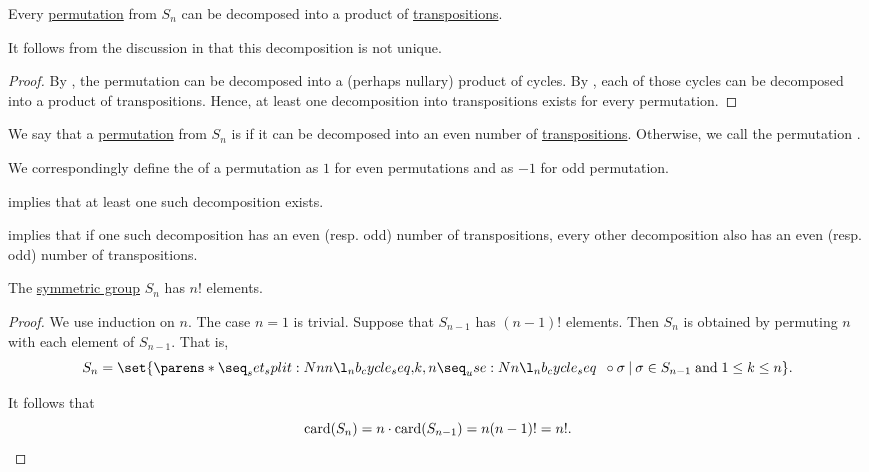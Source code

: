 \begin{proposition}\label{thm:permutation_decomposition_existence}
  Every \hyperref[def:symmetric_group]{permutation} from \( S_n \) can be decomposed into a product of \hyperref[def:cyclic_permutation]{transpositions}.
\end{proposition}
\begin{comments}
  \item It follows from the discussion in  that this decomposition is not unique.
\end{comments}
\begin{proof}
  By , the permutation can be decomposed into a (perhaps nullary) product of cycles. By , each of those cycles can be decomposed into a product of transpositions. Hence, at least one decomposition into transpositions exists for every permutation.
\end{proof}

\begin{definition}\label{def:permutation_parity}\mimprovised
  We say that a \hyperref[def:symmetric_group]{permutation} from \( S_n \) is  if it can be decomposed into an even number of \hyperref[def:cyclic_permutation]{transpositions}. Otherwise, we call the permutation .

  We correspondingly define the  of a permutation as \( 1 \) for even permutations and as \( -1 \) for odd permutation.
\end{definition}
\begin{defproof}
   implies that at least one such decomposition exists.

   implies that if one such decomposition has an even (resp. odd) number of transpositions, every other decomposition also has an even (resp. odd) number of transpositions.
\end{defproof}

\begin{proposition}\label{thm:symmetric_group_cardinality}
  The \hyperref[def:symmetric_group]{symmetric group} \( S_n \) has \( n! \) elements.
\end{proposition}
\begin{proof}
  We use induction on \( n \). The case \( n = 1 \) is trivial. Suppose that \( S_{n-1} \) has \( (n-1)! \) elements. Then \( S_n \) is obtained by permuting \( n \) with each element of \( S_{n-1} \). That is,
  \begin{equation*}
    S_n = \set{ \cycle{ k, n } \bincirc \sigma \given \sigma \in S_{n-1} \T{and} 1 \leq k \leq n }.
  \end{equation*}

  It follows that
  \begin{equation*}
    \operatorname{card}(S_n) = n \cdot \operatorname{card}(S_{n-1}) = n (n-1)! = n!.
  \end{equation*}
\end{proof}

